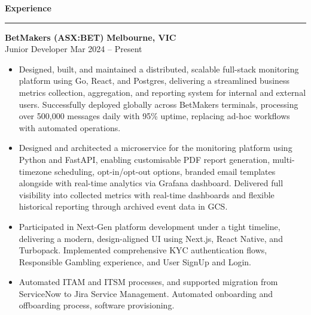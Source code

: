\documentclass[11pt, letterpaper]{article}
\newcommand{\cvsection}[1]{
	\vspace{0.5em}
	\noindent\textbf{#1}\\[-0.5em] 
	\rule{\textwidth}{0.5pt}
	\vspace{0.5em}
}
\begin{document}
\cvsection{Experience}
\scriptsize \textbf{BetMakers (ASX:BET)} \hfill \textbf{Melbourne, VIC} \\[-0.6em]
\scriptsize {Junior Developer} \hfill Mar 2024 -- Present
\vspace{-0.5em}
\begin{itemize}
    \setlength\itemsep{-0.2em}
    \setlength\leftskip{-2em}
    \setlength{}
    \setlength\itemindent{0em} 
    \item Designed, built, and maintained a distributed, scalable full-stack monitoring platform using Go, React, and Postgres, delivering a streamlined business metrics collection, aggregation, and reporting system for internal and external users. Successfully deployed globally across BetMakers terminals, processing over 500,000 messages daily with 95\% uptime, replacing ad-hoc workflows with automated operations. 
    \item Designed and architected a microservice for the monitoring platform using Python and FastAPI, enabling customisable PDF report generation, multi-timezone scheduling, opt-in/opt-out options, branded email templates alongside with real-time analytics via Grafana dashboard. Delivered full visibility into collected metrics with real-time dashboards and flexible historical reporting through archived event data in GCS.
    \item Participated in Next-Gen platform development under a tight timeline, delivering a modern, design-aligned UI using Next.js, React Native, and Turbopack. Implemented comprehensive KYC authentication flows, Responsible Gambling experience, and User SignUp and Login.
    \item Automated ITAM and ITSM processes, and supported migration from ServiceNow to Jira Service Management. Automated onboarding and offboarding process, software provisioning.
\end{itemize}
\vspace{0.5em}
\end{document}
